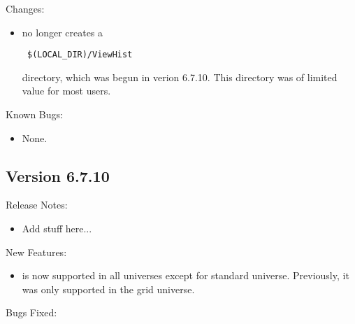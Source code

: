 \noindent Changes:

\begin{itemize}

\item {} no longer creates a
\begin{verbatim} $(LOCAL_DIR)/ViewHist \end{verbatim}
directory, which was begun in verion 6.7.10.  This directory was of limited
value for most users.

\end{itemize}

\noindent Known Bugs:

\begin{itemize}

\item None.

\end{itemize}



\subsection{\label{sec:New-6-7-10}Version 6.7.10}

\noindent Release Notes:

\begin{itemize}

\item Add stuff here...

\end{itemize}

\noindent New Features:

\begin{itemize}

\item {} is now supported in all universes except
for standard universe.  Previously, it was only supported in the grid universe.


\end{itemize}

\noindent Bugs Fixed:

